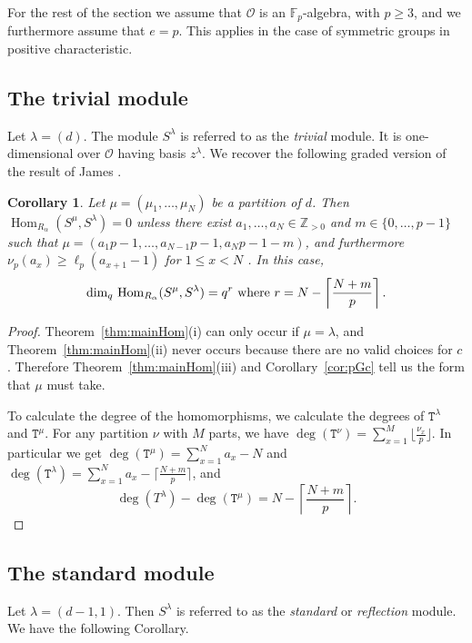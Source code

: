 \documentclass[twoside,11pt,reqno,letter]{amsart}
\numberwithin{equation}{section}
\newtheorem{Corollary}[equation]{Corollary}
\theoremstyle{definition}  %
\newcommand{\Hom}{\operatorname{Hom}}
\def\qdim{{\operatorname{dim}_q}\,}
\newcommand{\F}{\mathbb{F}}
\newcommand{\Z}{\mathbb{Z}}
\newcommand{\0}{{\bar 0}}
\newcommand{\1}{{\bar 1}}
\newcommand{\la}{\lambda}
\newcommand{\al}{\alpha}
\def\T{{\mathtt T}}
\renewcommand\O{\mathcal O}
\begin{document}
{For the rest of the section we assume that $\O$ is an $\F_p$-algebra, with $p \geq 3$, and we furthermore assume that $e=p$. This applies in the case of symmetric groups in positive characteristic.

\subsection{The trivial module}

Let $\la = (d)$. The module $S^{\la}$ is referred to as the \emph{trivial} module. It is one-dimensional over $\O$ having basis $z^\la$. 
We recover the following graded version of the result of James \cite[Theorem 24.4]{J}.

\begin{Corollary}\label{cor:triv}
  Let $\mu = (\mu_1, \dots, \mu_N)$ be a partition of $d$. Then $\Hom_{R_\al}(S^\mu, S^\la) = 0$ unless there exist $a_1, \dots, a_N \in \Z_{>0}$ and $m \in \{0, \dots, p-1\}$ such that $\mu = (a_1 p - 1, \dots, a_{N-1} p - 1, a_N p - 1 - m)$, and furthermore $\nu_p(a_x) \geq \ell_p(a_{x+1} - 1)$ for $1 \leq x < N$ . In this case, 
  $$\qdim \Hom_{R_\al}(S^\mu, S^\la) = q^r \textup{ where } r=N-\left\lceil \frac{N+m}{p} \right\rceil.$$
\end{Corollary}

\begin{proof}
  Theorem~\ref{thm:mainHom}(i) can only occur if $\mu = \la$, and Theorem~\ref{thm:mainHom}(ii) never occurs because there are no valid choices for $c$. Therefore Theorem~\ref{thm:mainHom}(iii) and Corollary~\ref{cor:pGc} tell us the form that $\mu$ must take.

  To calculate the degree of the homomorphisms, we calculate the degrees of $\T^\la$ and $\T^\mu$. For any partition $\nu$ with $M$ parts, we have $\deg(\T^\nu) = \sum_{x=1}^M \lfloor \frac{\nu_x}{p} \rfloor$. In particular we get $\deg(\T^\mu) = \sum_{x=1}^N a_x - N$ and $\deg(\T^\la) = \sum_{x=1}^N a_x - \lceil \frac{N+m}{p} \rceil$, and
  $$\deg(T^\la) - \deg(\T^\mu) = N-\left\lceil \frac{N+m}{p} \right\rceil.$$
\end{proof}

\subsection{The standard module}

Let $\la = (d-1, 1)$. Then $S^\la$ is referred to as the \emph{standard} or \emph{reflection} module. We have the following Corollary.

}
\end{document}
